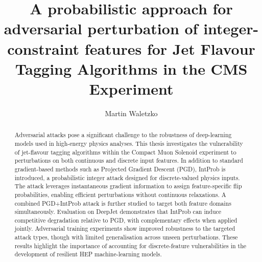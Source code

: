 \documentclass[12pt]{caltech_thesis}
\begin{document}
\title{\textbf{A probabilistic approach for adversarial perturbation of integer-constraint features for Jet Flavour Tagging Algorithms in the CMS Experiment}}
\author{Martin Waletzko}




\maketitle

\begin{acknowledgements}
\end{acknowledgements}

\begin{abstract}

Adversarial attacks pose a significant challenge to the robustness of deep-learning models used in high-energy physics analyses. This thesis investigates the vulnerability of jet-flavour tagging algorithms within the Compact Muon Solenoid experiment to perturbations on both continuous and discrete input features. In addition to standard gradient-based methods such as Projected Gradient Descent (PGD), IntProb is introduced, a probabilistic integer attack designed for discrete-valued physics inputs. The attack leverages instantaneous gradient information to assign feature-specific flip probabilities, enabling efficient perturbations without continuous relaxations. A combined PGD+IntProb attack is further studied to target both feature domains simultaneously. Evaluation on DeepJet demonstrates that IntProb can induce competitive degradation relative to PGD, with complementary effects when applied jointly. Adversarial training experiments show improved robustness to the targeted attack types, though with limited generalisation across unseen perturbations. These results highlight the importance of accounting for discrete-feature vulnerabilities in the development of resilient HEP machine-learning models.

\vfill
\noindent{}

\end{abstract}
\end{document}
